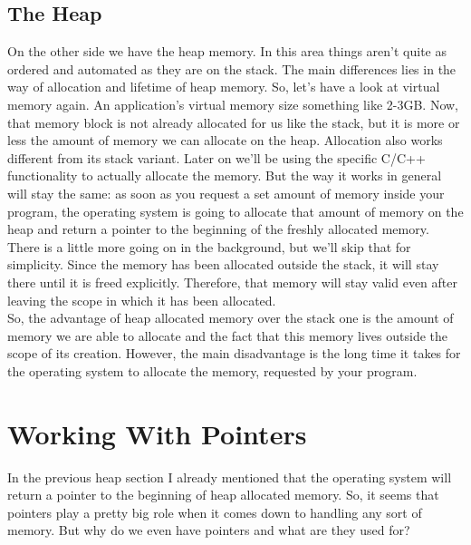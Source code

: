 \documentclass{article}
\begin{document}
  \subsection{The Heap}
  On the other side we have the heap memory.
  In this area things aren't quite as ordered and automated as they are on the stack.
  The main differences lies in the way of allocation and lifetime of heap memory.
  So, let's have a look at virtual memory again.
  An application's virtual memory size something like 2-3GB.
  Now, that memory block is not already allocated for us like the stack, but it is more or less the amount of memory we can allocate on the heap.
  Allocation also works different from its stack variant.
  Later on we'll be using the specific C/C++ functionality to actually allocate the memory.
  But the way it works in general will stay the same: as soon as you request a set amount of memory inside your program, the operating system is going to allocate that amount of memory on the heap and return a pointer to the beginning of the freshly allocated memory.
  There is a little more going on in the background, but we'll skip that for simplicity.
  Since the memory has been allocated outside the stack, it will stay there until it is freed explicitly.
  Therefore, that memory will stay valid even after leaving the scope in which it has been allocated.
  \\So, the advantage of heap allocated memory over the stack one is the amount of memory we are able to allocate and the fact that this memory lives outside the scope of its creation.
  However, the main disadvantage is the long time it takes for the operating system to allocate the memory, requested by your program.
  \section{Working With Pointers}
  In the previous heap section I already mentioned that the operating system will return a pointer to the beginning of heap allocated memory.
  So, it seems that pointers play a pretty big role when it comes down to handling any sort of memory.
  But why do we even have pointers and what are they used for?
\end{document}
